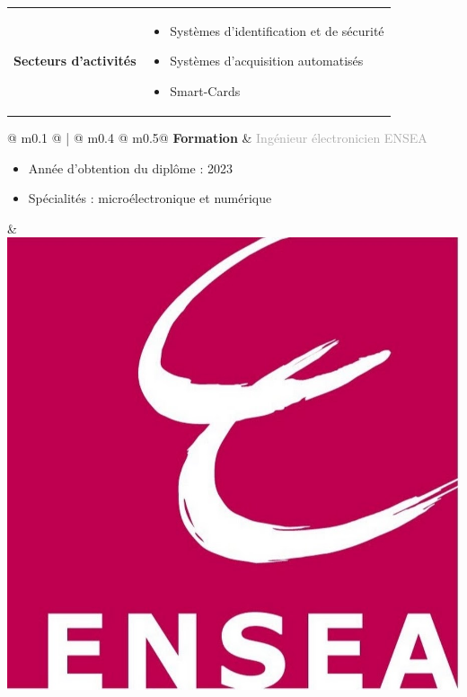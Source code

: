 \documentclass{article}
\begin{document}
\begin{center}
\end{center}


\begin{tabular}{@{\hspace{0.05\textwidth}}m{}@{\hspace{0.05\textwidth}}!{\color{secondaryBlue}\vline width 2pt}@{}C{0.7\textwidth}@{}}
    \textcolor{secondaryBlue}{\textbf{Secteurs d'activités}} & 
    \begin{itemize}[label={}, topsep=0pt, partopsep=0pt, itemsep=0.5pt, parsep=2pt, after=\vspace*{-\baselineskip}]
        \item \textcolor{gray!100}{Systèmes d'identification et de sécurité}
        \item \textcolor{gray!100}{Systèmes d'acquisition automatisés}
        \item \textcolor{gray!100}{Smart-Cards}
    \end{itemize}
\end{tabular}



\begin{center}
\end{center}


\begin{tabular}{@{\hspace{0.05\textwidth}} m{0.1\textwidth} @ {\hspace{0.05\textwidth}} ! {\color{secondaryBlue}\vline width 2pt \hspace{0.04\textwidth}} @ {}m{0.4\textwidth} @{\hspace{0.15\textwidth}} m{0.5\linewidth}@{}}
    \textcolor{secondaryBlue}{\textbf{Formation}} & 
    \textcolor{darkGray}{Ingénieur électronicien ENSEA}
    \begin{itemize}[label={\textcolor{gray!100}{\checkmark}}, topsep=0pt, partopsep=0pt, itemsep=0.5pt, parsep=2pt, after=\vspace*{-\baselineskip}]
        \item \textcolor{gray!100}{Année d'obtention du diplôme : 2023} 
        \item \textcolor{gray!100}{Spécialités : microélectronique et numérique} 
    \end{itemize} &
    \includegraphics[width=0.1\linewidth]{ensea.jpg}
\end{tabular}
\end{document}
